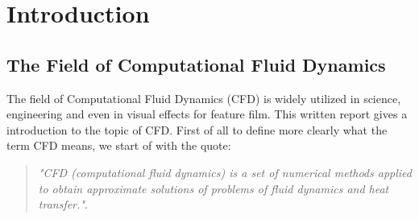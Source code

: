 
\chapter{Introduction} %

\label{Chapter1} %



\section{The Field of Computational Fluid Dynamics}

The field of Computational Fluid Dynamics (CFD) is widely utilized in science, engineering and even in visual effects for feature film. This written report gives a introduction to the topic of CFD. First of all to define more clearly what the term CFD means, we start of with the quote:

\begin{quote}
\emph{"CFD (computational fluid dynamics) is a set of numerical methods applied to obtain
approximate solutions of problems of fluid dynamics and heat transfer."}\citep[p.~1]{Zikanov2010}. 
\end{quote}

